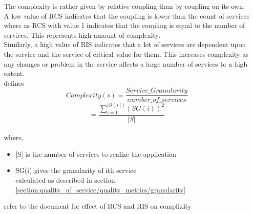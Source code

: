 {{{{{The complexity is rather given by relative coupling than by coupling on its own. A low value of RCS indicates that the coupling is lower than the count of services where as RCS with value 1 indicates that the coupling is equal to the number of services. This represents high amount of complexity.
\\
Similarly, a high value of RIS indicates that a lot of services are dependent upon the service and the service of critical value for them. This increases complexity as any changes or problem in the service affects a large number of services to a high extent.
\\
\cite{Saad-Alahmari:2011aa} defines
$$ Complexity(s) = \frac{Service\_Granularity}{number\_of\_services} $$ $$ =\frac{\sum_{i=1}^{|O(s)|}(SG(i))^2}{|S|}$$
\\
where,
\\
\begin{itemize}[leftmargin=.5in]
\item |S| is the number of services to realize the application
\item SG(i) gives the granularity of ith service 
\\calculated as described in section \ref{section:quality_of_service/quality_metrics/granularity}
\end{itemize}

refer to the document for effect of RCS and RIS on complixity

}}}}}
